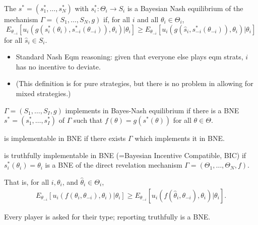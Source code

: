 \documentclass[english]{beamer}		%
\def\lyxframeend{} %
\begin{document}
\begin{definition}
	The  $s^* =(s_{1}^*,\dots,s_{N}^*)$ with $s_i^*: \Theta_i \to S_i$ is a \alert{Bayesian Nash equilibrium} of the mechanism $\Gamma=(S_{1},\dots,S_{N},g)$ if, for all $i$ and all $\theta_{i}\in\Theta_{i}$,
	$$E_{\theta_{-i}}\left[u_{i}(g(s_i^*(\theta_i),s_{-i}^*(\theta_{-i})),\theta_{i})|\theta_{i}\right]\geq E_{\theta_{-i}}\left[u_{i}(g(\hat s_i,s_{-i}^*(\theta_{-i})),\theta_{i})|\theta_{i}\right]$$
	for all $\hat s_{i}\in S_{i}$.
\end{definition}
\pause
\begin{itemize}
	\item Standard Nash Eqm reasoning: given that everyone else plays eqm strats, $i$ has no incentive to deviate.
	\item (This definition is for pure strategies, but there is no problem in allowing for mixed strategies.)
\end{itemize}
\vspace{-1em}
\lyxframeend


\begin{definition}
	 $\Gamma=(S_{1},\dots,S_{I},g)$ \alert{implements  in Bayes-Nash equilibrium} if there is a BNE $s^*=(s_{1}^*,\dots,s_{I}^*)$ of $\Gamma$ such that $f(\theta)=g(s^{*}(\theta))$ for all $\theta\in \Theta$.
\end{definition}
\pause
\begin{definition}
	 is \alert{implementable in BNE} if there exists $\Gamma$ which implements it in BNE.
\end{definition}
\lyxframeend


\begin{definition}
	 is \alert{truthfully implementable in BNE} (=Bayesian Incentive Compatible, \alert{BIC}) if $s_{i}^*(\theta_{i})=\theta_{i}$ is a BNE of the direct revelation mechanism $\Gamma=(\Theta_{1},\dots,\Theta_{N},f)$. 
	\bigskip
	
	That is, for all $i,\theta_{i}$, and $\hat{\theta}_{i}\in\Theta_{i}$,
	\vspace{-0.5em}\begin{align*}
		E_{\theta_{-i}}\left[u_{i}(f(\theta_i,\theta_{-i}),\theta_{i})|\theta_{i}\right]\geq E_{\theta_{-i}}\left[u_{i}(f(\hat \theta_{i},\theta_{-i}),\theta_{i})|\theta_{i}\right].
	\end{align*}\vspace{-1em}
\end{definition}
\pause
Every player is asked for their type; reporting truthfully is a BNE.
\lyxframeend
\end{document}
